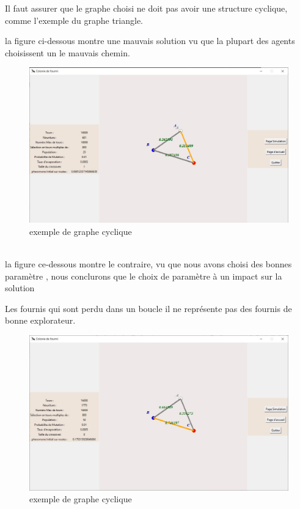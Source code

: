 \documentclass{rapportECL}
\begin{document}
Il faut assurer que le graphe choisi ne doit pas avoir une structure cyclique, comme l'exemple du graphe triangle.

la figure ci-dessous montre une mauvais solution vu que la plupart des agents choisissent un le mauvais chemin.

\begin{figure}[H]
    \centering
    \includegraphics[width=0.8\linewidth]{triangle-mauvaise-solution.jpg}
    \caption{ exemple de graphe cyclique }
    \label{Dim}
\end{figure}\\

la figure ce-dessous montre le contraire, vu que nous avons choisi des bonnes paramètre , nous conclurons que le choix de paramètre à un impact sur la solution 

Les fournis qui sont perdu dans un boucle il ne représente pas des fournis de bonne explorateur.

\begin{figure}[H]
    \centering
    \includegraphics[width=0.8\linewidth]{ triangle-bonne-solution.jpg}
    \caption{ exemple de graphe cyclique }
    \label{Dim}
\end{figure}\\
\end{document}
